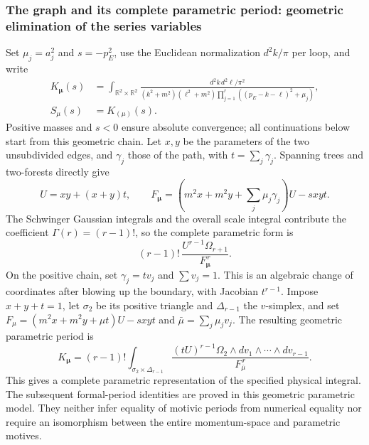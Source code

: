 \documentclass[11pt,a4paper,oneside]{article}
\theoremstyle{plain}
\theoremstyle{definition}
\theoremstyle{remark}
\numberwithin{equation}{section}
\begin{document}
\subsubsection{The graph and its complete parametric period: geometric elimination of the series variables}
Set $\mu_j=a_j^2$ and $s=-p_E^2$, use the Euclidean normalization $d^2k/\pi$ per loop, and write
\begin{align}
 K_{\boldsymbol\mu}(s)
 &=\int_{\mathbb R^2\times\mathbb R^2}
 \frac{d^2k\,d^2\ell/\pi^2}
 {(k^2+m^2)(\ell^2+m^2)
       \prod_{j=1}^r((p_E-k-\ell)^2+\mu_j)}, \label{unified:eq:seriesmom}\\
 S_\mu(s)&=K_{(\mu)}(s).
\end{align}
Positive masses and $s<0$ ensure absolute convergence; all continuations below start from this geometric chain.
Let $x,y$ be the parameters of the two unsubdivided edges, and $\gamma_j$ those of the path, with $t=\sum_j\gamma_j$.
Spanning trees and two-forests directly give
\[
 U=xy+(x+y)t,\qquad
 F_{\boldsymbol\mu}
 =\left(m^2x+m^2y+\sum_j\mu_j\gamma_j\right)U-sxyt.
\]
The Schwinger Gaussian integrals and the overall scale integral contribute the coefficient $\Gamma(r)=(r-1)!$,
so the complete parametric form is
\[
 (r-1)!\,\frac{U^{r-1}\Omega_{r+1}}{F_{\boldsymbol\mu}^{\,r}}.
\]
On the positive chain, set $\gamma_j=t v_j$ and $\sum v_j=1$.
This is an algebraic change of coordinates after blowing up the boundary, with Jacobian $t^{r-1}$.
Impose $x+y+t=1$, let $\sigma_2$ be its positive triangle and $\Delta_{r-1}$ the $v$-simplex,
and set $F_\mu=(m^2x+m^2y+\mu t)U-sxyt$ and $\bar\mu=\sum_j\mu_jv_j$. The resulting geometric parametric period is
\begin{equation}\label{unified:eq:seriessimplex}
 K_{\boldsymbol\mu}
 =(r-1)!\int_{\sigma_2\times\Delta_{r-1}}
 \frac{(tU)^{r-1}\Omega_2\wedge dv_1\wedge\cdots\wedge dv_{r-1}}
 {F_{\bar\mu}^{\,r}}.
\end{equation}
This gives a complete parametric representation of the specified physical integral.
The subsequent formal-period identities are proved in this geometric parametric model.
They neither infer equality of motivic periods from numerical equality nor require an isomorphism between the entire momentum-space and parametric motives.
\end{document}
